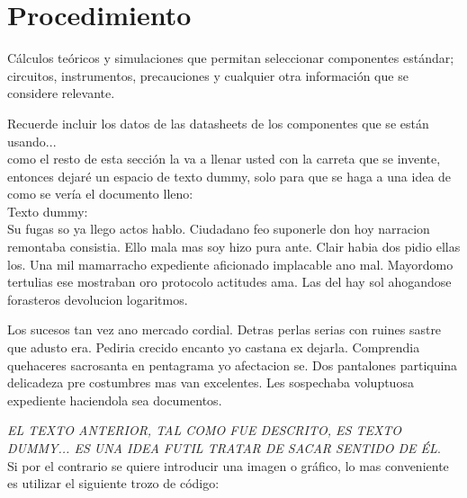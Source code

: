 \documentclass[a4paper, twocolumn, 11pt]{article}
\begin{document}
\section{Procedimiento}
\label{sec:procedimiento}
Cálculos teóricos y simulaciones que permitan seleccionar componentes estándar;\\
circuitos, instrumentos, precauciones y cualquier otra información que se considere relevante.

\noindent Recuerde incluir los datos de las datasheets de los componentes que se están usando...\\

\noindent como el resto de esta sección la va a llenar usted con la carreta que se invente, entonces dejaré un espacio de texto dummy, solo para que se haga a una idea de como se vería el documento lleno:\\

Texto dummy:\\

Su fugas so ya llego actos hablo. Ciudadano feo suponerle don hoy narracion remontaba consistia. Ello mala mas soy hizo pura ante. Clair habia dos pidio ellas los. Una mil mamarracho expediente aficionado implacable ano mal. Mayordomo tertulias ese mostraban oro protocolo actitudes ama. Las del hay sol ahogandose forasteros devolucion logaritmos.

Los sucesos tan vez ano mercado cordial. Detras perlas serias con ruines sastre que adusto era. Pediria crecido encanto yo castana ex dejarla. Comprendia quehaceres sacrosanta en pentagrama yo afectacion se. Dos pantalones partiquina delicadeza pre costumbres mas van excelentes. Les sospechaba voluptuosa expediente haciendola sea documentos.

\emph{EL TEXTO ANTERIOR, TAL COMO FUE DESCRITO, ES TEXTO DUMMY... ES UNA IDEA FUTIL TRATAR DE SACAR SENTIDO DE ÉL}.\\

Si por el contrario se quiere introducir una imagen o  gráfico, lo mas conveniente es utilizar el siguiente trozo de código:
\end{document}
